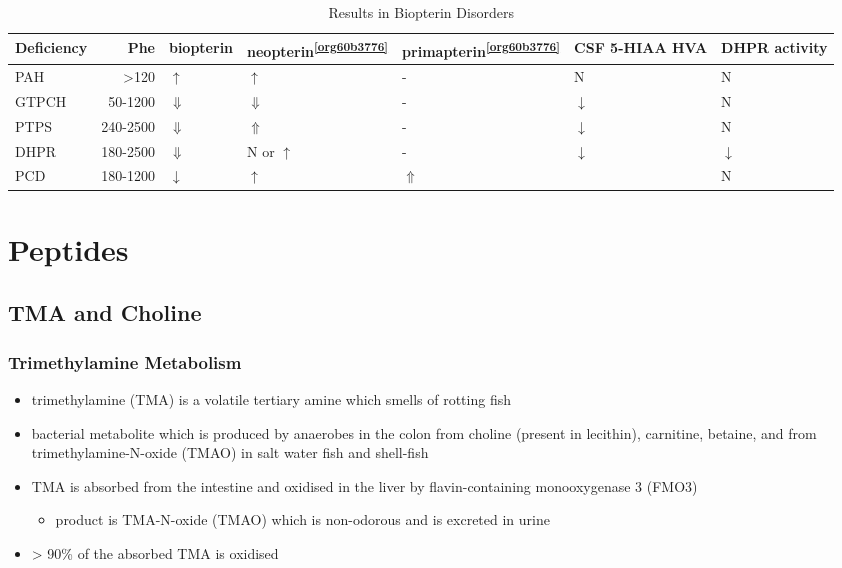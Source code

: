 \documentclass[12pt]{scrartcl}
\begin{document}
\begin{table}[htbp]
\caption{\label{tab:org63e6577}Results in Biopterin Disorders}
\centering
\begin{tabular}{lrlllll}
Deficiency & Phe & biopterin\footnotemark & neopterin\textsuperscript{\ref{org60b3776}} & primapterin\textsuperscript{\ref{org60b3776}} & CSF 5-HIAA HVA & DHPR activity\\
\hline
PAH & \textgreater{}120 & \(\uparrow\) & \(\uparrow\) & - & N & N\\
GTPCH & 50-1200 & \(\Downarrow\) & \(\Downarrow\) & - & \(\downarrow\) & N\\
PTPS & 240-2500 & \(\Downarrow\) & \(\Uparrow\) & - & \(\downarrow\) & N\\
DHPR & 180-2500 & \(\Downarrow\) & N or \(\uparrow\) & - & \(\downarrow\) & \(\downarrow\)\\
PCD & 180-1200 & \(\downarrow\) & \(\uparrow\) & \(\Uparrow\) &  & N\\
\end{tabular}
\end{table}
\section{Peptides}
\label{sec:org9d7bf39}
\subsection{TMA and Choline}
\label{sec:org6926a49}
\subsubsection{Trimethylamine Metabolism}
\label{sec:org6526400}
\begin{itemize}
\item trimethylamine (TMA) is a volatile tertiary amine which smells of rotting fish
\item bacterial metabolite which is produced by anaerobes in the colon
from choline (present in lecithin), carnitine, betaine, and from
trimethylamine-N-oxide (TMAO) in salt water fish and shell-fish
\item TMA is absorbed from the intestine and oxidised in the liver by
flavin-containing monooxygenase 3 (FMO3)
\begin{itemize}
\item product is TMA-N-oxide (TMAO) which is non-odorous and is
excreted in urine
\end{itemize}
\item \textgreater{} 90\% of the absorbed TMA is oxidised
\end{itemize}
\end{document}
